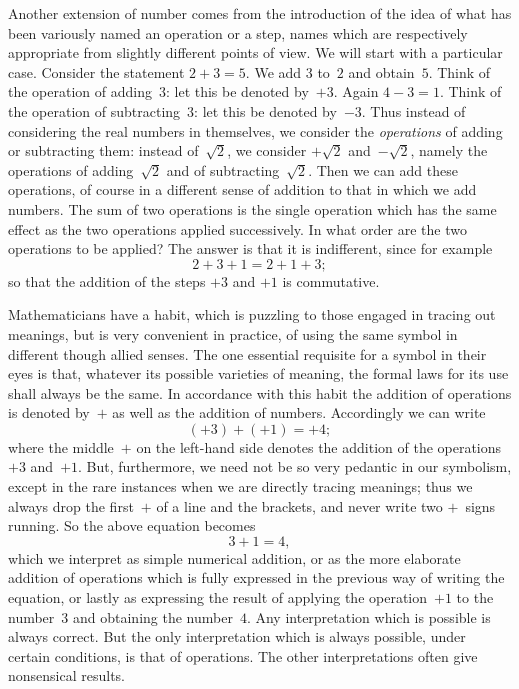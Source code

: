 \documentclass[12pt,leqno]{book}[2005/09/16]
\newcommand{\PageSep}[1]{\ignorespaces}
\begin{document}
Another extension of number comes from
%
the introduction of the idea of what has been
variously named an operation or a step,
names which are respectively appropriate
from slightly different points of view. We
will start with a particular case. Consider
\PageSep{80}
the statement $2 + 3 = 5$. We add $3$ to~$2$ and
obtain~$5$. Think of the operation of adding~$3$:
let this be denoted by~$+3$. Again $4 - 3 = 1$.
Think of the operation of subtracting~$3$:
let this be denoted by~$-3$. Thus instead
of considering the real numbers in themselves,
we consider the \emph{operations} of adding or subtracting
them: instead of~$\sqrt{2}$, we consider
$+\sqrt{2}$ and~$-\sqrt{2}$, namely the operations of
adding~$\sqrt{2}$ and of subtracting~$\sqrt{2}$. Then we
can add these operations, of course in a
different sense of addition to that in which we
add numbers. The sum of two operations is
the single operation which has the same effect
as the two operations applied successively.
In what order are the two operations to be
applied? The answer is that it is indifferent,
since for example
\[
2 + 3 + 1 = 2 + 1 + 3;
\]
so that the addition of the steps $+3$ and $+1$
is commutative.

Mathematicians have a habit, which is
puzzling to those engaged in tracing out
meanings, but is very convenient in practice,
of using the same symbol in different though
allied senses. The one essential requisite for
a symbol in their eyes is that, whatever its
possible varieties of meaning, the formal laws
for its use shall always be the same. In
\PageSep{81}
accordance with this habit the addition of
operations is denoted by~$+$ as well as the
addition of numbers. Accordingly we can
write
\[
(+3) + (+1) = +4;
\]
where the middle~$+$ on the left-hand side
denotes the addition of the operations $+3$
and~$+1$. But, furthermore, we need not be
so very pedantic in our symbolism, except in
the rare instances when we are directly tracing
meanings; thus we always drop the first~$+$
of a line and the brackets, and never write
two $+$~signs running. So the above equation
becomes
\[
3 + 1 = 4,
\]
which we interpret as simple numerical addition,
or as the more elaborate addition of
operations which is fully expressed in the
previous way of writing the equation, or
lastly as expressing the result of applying
the operation~$+1$ to the number~$3$ and obtaining
the number~$4$. Any interpretation
which is possible is always correct. But the
only interpretation which is always possible,
under certain conditions, is that of operations.
The other interpretations often give nonsensical
results.
\end{document}
